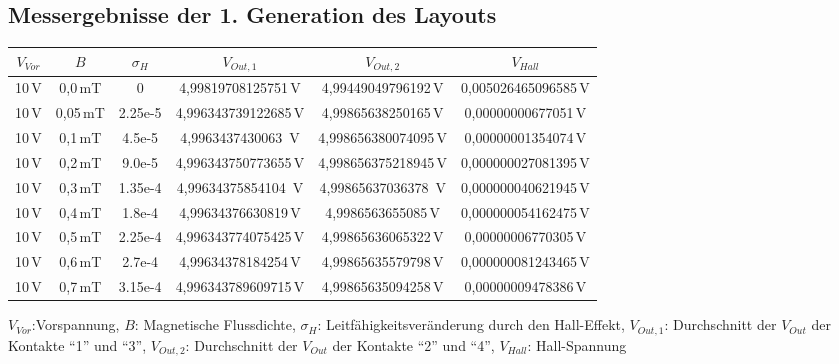 \documentclass[12pt, a4paper]{article}
\renewcommand{\footnotesize}{\fontsize{10pt}{12pt}\selectfont}
\begin{document}
\subsection*{Messergebnisse der 1. Generation des Layouts}
\begin{center}
	\begin{tabular}{||c c c c c c||} 
		\hline
		$V_{Vor}$ & $B$ & $\sigma_H$ & $V_{Out,1}$ & $V_{Out,2}$ & $V_{Hall}$\\ [0.5ex] 
		\hline\hline
		10\,V & 0,0\,mT & 0       & 4,99819708125751\,V  & 4,99449049796192\,V   &  0,005026465096585\,V  \\ 
		\hline
		10\,V & 0,05\,mT& 2.25e-5 & 4,996343739122685\,V &  4,99865638250165\,V  &  0,00000000677051\,V   \\
		\hline
		10\,V & 0,1\,mT & 4.5e-5  & 4,9963437430063  \,V & 4,998656380074095\,V  &  0,00000001354074\,V   \\
		\hline
		10\,V & 0,2\,mT & 9.0e-5  & 4,996343750773655\,V & 4,998656375218945\,V  &  0,000000027081395\,V  \\
		\hline
		10\,V & 0,3\,mT & 1.35e-4 & 4,99634375854104 \,V & 4,99865637036378 \,V  &  0,000000040621945\,V  \\  
		\hline
		10\,V & 0,4\,mT & 1.8e-4  & 4,99634376630819\,V  & 4,9986563655085\,V    &  0,000000054162475\,V  \\
		\hline
		10\,V & 0,5\,mT & 2.25e-4 & 4,996343774075425\,V & 4,99865636065322\,V   &  0,00000006770305\,V   \\
		\hline
		10\,V & 0,6\,mT & 2.7e-4  & 4,99634378184254\,V  & 4,99865635579798\,V   &  0,000000081243465\,V  \\
		\hline
		10\,V & 0,7\,mT & 3.15e-4 & 4,996343789609715\,V & 4,99865635094258\,V   &  0,00000009478386\,V   \\ [1ex] 
		\hline
	\end{tabular}
\end{center}
\vspace{-0.8em}
\begin{center}
	\footnotesize
	$V_{Vor}$:Vorspannung, $B$: Magnetische Flussdichte, $\sigma_H$: Leitfähigkeitsveränderung durch den Hall-Effekt, $V_{Out,1}$: Durchschnitt der $V_{Out}$ der Kontakte ``1'' und ``3'', $V_{Out,2}$: Durchschnitt der $V_{Out}$ der Kontakte ``2'' und ``4'', $V_{Hall}$: Hall-Spannung
\end{center}
\end{document}
